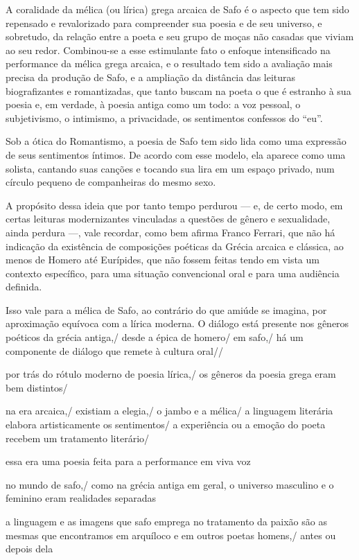 \documentclass[12pt]{extarticle}
\begin{document}
A coralidade da mélica (ou lírica) grega arcaica de Safo é o aspecto que tem sido 
repensado e revalorizado para compreender sua poesia e de seu universo, e sobretudo, 
da relação entre a poeta e seu grupo de moças não casadas que viviam ao seu redor.
Combinou-se a esse estimulante fato o enfoque intensificado na performance da mélica 
grega arcaica, e o resultado tem sido a avaliação mais precisa da produção de Safo, 
e a ampliação da distância das leituras biografizantes e romantizadas, que tanto 
buscam na poeta o que é estranho à sua poesia e, em verdade, à poesia antiga como 
um todo: a voz pessoal, o subjetivismo, o intimismo, a privacidade, os sentimentos 
confessos do “eu”. 

Sob a ótica do Romantismo, a poesia de Safo tem sido lida como uma expressão de 
seus sentimentos íntimos. De acordo com esse modelo, ela aparece como uma solista, 
cantando suas canções e tocando sua lira em um espaço privado, num círculo 
pequeno de companheiras do mesmo sexo.

A propósito dessa ideia que por tanto tempo perdurou --- e, de certo modo, em
certas leituras modernizantes vinculadas a questões de gênero e sexualidade, 
ainda perdura ---, vale recordar, como bem afirma Franco Ferrari, que não há 
indicação da existência de composições poéticas da Grécia arcaica e clássica, 
ao menos de Homero até Eurípides, que não fossem feitas tendo em vista um 
contexto específico, para uma situação convencional oral e para uma audiência definida. 

Isso vale para a mélica de Safo, ao contrário do que amiúde se imagina, por 
aproximação equívoca com a lírica moderna. O diálogo está presente nos gêneros 
poéticos da grécia antiga,/ desde a épica de homero/ em safo,/ há um componente 
de diálogo que remete à cultura oral//
 
por trás do rótulo moderno de poesia lírica,/ os gêneros da poesia grega eram bem distintos/ 
 
na era arcaica,/ existiam a elegia,/ o jambo e a mélica/
a linguagem literária elabora artisticamente os sentimentos/  a experiência ou a emoção do poeta recebem um tratamento literário/
 
essa era uma poesia feita para a performance em viva voz

no mundo de safo,/ como na grécia antiga em geral, o universo masculino e o feminino eram realidades separadas

a linguagem e as imagens que safo emprega no tratamento da paixão são as mesmas que encontramos em arquíloco e em outros poetas homens,/ antes ou depois dela
\end{document}
